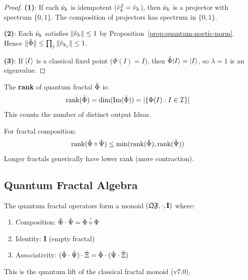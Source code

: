 \begin{proof}
\textbf{(1)}: If each $\hat{\nu}_k$ is idempotent ($\hat{\nu}_k^2 = \hat{\nu}_k$), then $\hat{\nu}_k$ is a projector with spectrum $\{0, 1\}$. The composition of projectors has spectrum in $\{0, 1\}$.

\textbf{(2)}: Each $\hat{\nu}_k$ satisfies $\|\hat{\nu}_k\| \leq 1$ by Proposition~\ref{prop:quantum-noetic-norm}. Hence $\|\hat{\Phi}\| \leq \prod_j \|\hat{\nu}_{k_j}\| \leq 1$.

\textbf{(3)}: If $|I\rangle$ is a classical fixed point ($\Phi(I) = I$), then $\hat{\Phi}|I\rangle = |I\rangle$, so $\lambda = 1$ is an eigenvalue.
\end{proof}

\begin{definition}
\label{def:fractal-rank}
The \textbf{rank} of quantum fractal $\hat{\Phi}$ is:
\[
\mathrm{rank}(\hat{\Phi}) = \dim(\mathrm{Im}(\hat{\Phi})) = |\{\Phi(I) : I \in \mathcal{I}\}|
\]
This counts the number of distinct output Ideas.
\end{definition}

\begin{proposition}
\label{prop:rank-decrease}
For fractal composition:
\[
\mathrm{rank}(\hat{\Phi} \circ \hat{\Psi}) \leq \min(\mathrm{rank}(\hat{\Phi}), \mathrm{rank}(\hat{\Psi}))
\]
Longer fractals generically have lower rank (more contraction).
\end{proposition}

\subsection{Quantum Fractal Algebra}

\begin{theorem}
\label{thm:qfractal-monoid}
The quantum fractal operators form a monoid $(\mathfrak{Q}\mathfrak{F}, \cdot, \mathbf{I})$ where:
\begin{enumerate}
  \item Composition: $\hat{\Phi} \cdot \hat{\Psi} = \hat{\Phi \circ \Psi}$
  \item Identity: $\mathbf{I}$ (empty fractal)
  \item Associativity: $(\hat{\Phi} \cdot \hat{\Psi}) \cdot \hat{\Xi} = \hat{\Phi} \cdot (\hat{\Psi} \cdot \hat{\Xi})$
\end{enumerate}
This is the quantum lift of the classical fractal monoid (v7.0).
\end{theorem}

